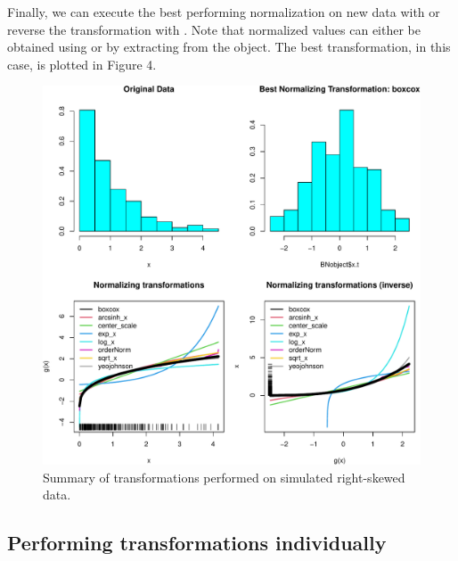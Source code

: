 Finally, we can execute the best performing normalization on new data
with  or reverse the
transformation with
.
Note that normalized values can either be obtained using 
or by extracting  from the object. The best transformation, in
this case, is plotted in Figure 4.

\begin{Schunk}
\begin{figure}

{\centering \includegraphics[width=1\linewidth]{figs/hist_best-1} 

}

\caption[Summary of transformations performed on simulated right-skewed data]{Summary of transformations performed on simulated right-skewed data.}\label{fig:hist_best}
\end{figure}
\end{Schunk}

\hypertarget{performing-transformations-individually}{%
\subsection{Performing transformations
individually}\label{performing-transformations-individually}}

